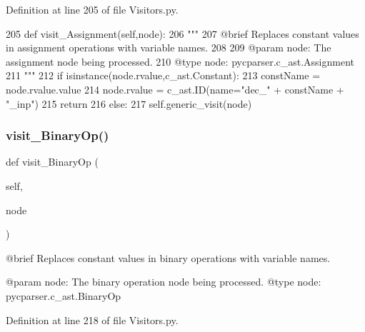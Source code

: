 Definition at line 205 of file Visitors.\+py.


\begin{DoxyCode}
205     \textcolor{keyword}{def }visit\_Assignment(self,node):
206         \textcolor{stringliteral}{"""
}
207 \textcolor{stringliteral}{        @brief Replaces constant values in assignment operations with variable names.
}
208 \textcolor{stringliteral}{
}
209 \textcolor{stringliteral}{        @param node: The assignment node being processed.
}
210 \textcolor{stringliteral}{        @type node: pycparser.c\_ast.Assignment
}
211 \textcolor{stringliteral}{        """}
212         \textcolor{keywordflow}{if} isinstance(node.rvalue,c\_ast.Constant):
213             constName = node.rvalue.value
214             node.rvalue = c\_ast.ID(name=\textcolor{stringliteral}{"dec\_"} + constName + \textcolor{stringliteral}{"\_inp"})
215             \textcolor{keywordflow}{return}
216         \textcolor{keywordflow}{else}:
217             self.generic\_visit(node)
\end{DoxyCode}
\mbox{\label{classVisitors_1_1ConstToVar_a6329fbf13e2d22de5384fbca843113b8}} 
\subsubsection{\texorpdfstring{visit\+\_\+\+Binary\+Op()}{visit\_BinaryOp()}}
{\footnotesize\ttfamily def visit\+\_\+\+Binary\+Op (\begin{DoxyParamCaption}\item[{}]{self,  }\item[{}]{node }\end{DoxyParamCaption})}

\begin{DoxyVerb}@brief Replaces constant values in binary operations with variable names.

@param node: The binary operation node being processed.
@type node: pycparser.c_ast.BinaryOp
\end{DoxyVerb}
 

Definition at line 218 of file Visitors.\+py.


